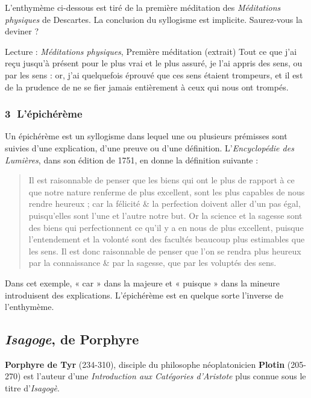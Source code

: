 L’enthymème ci-dessous est tiré de la première méditation des \textit{Méditations physiques} de Descartes. La conclusion du syllogisme est implicite. Saurez-vous la deviner ?

\begin{lecture}{Lecture : \textit{Méditations physiques}, Première méditation (extrait)}
Tout ce que j’ai reçu jusqu’à présent pour le plus vrai et le plus assuré, je l’ai appris des sens, ou par les sens : or, j’ai quelquefois éprouvé que ces sens étaient trompeurs, et il est de la prudence de ne se fier jamais entièrement à ceux qui nous ont trompés.
\end{lecture}

\subsubsection*{\textcircled{\scriptsize 3} L’épichérème}
Un épichérème est un syllogisme dans lequel une ou plusieurs prémisses sont suivies d’une explication, d’une preuve ou d’une définition. L’\textit{Encyclopédie des Lumières}, dans son édition de 1751, en donne la définition suivante :

\begin{quote}
Il est raisonnable de penser que les biens qui ont le plus de rapport à ce que notre nature renferme de plus excellent, sont les plus capables de nous rendre heureux ; car la félicité \& la perfection doivent aller d’un pas égal, puisqu’elles sont l’une et l’autre notre but. Or la science et la sagesse sont des biens qui perfectionnent ce qu’il y a en nous de plus excellent, puisque l’entendement et la volonté sont des facultés beaucoup plus estimables que les sens. Il est donc raisonnable de penser que l’on se rendra plus heureux par la connaissance \& par la sagesse, que par les voluptés des sens.
\end{quote}

Dans cet exemple, « car » dans la majeure et « puisque » dans la mineure introduisent des explications. L’épichérème est en quelque sorte l’inverse de l’enthymème.

\subsection{\textit{Isagoge}, de Porphyre}
\textbf{Porphyre de Tyr} (234-310), disciple du philosophe néoplatonicien \textbf{Plotin} (205-270) est l’auteur d’une \textit{Introduction aux Catégories d’Aristote} plus connue sous le titre d’\textit{Isagogè}.

